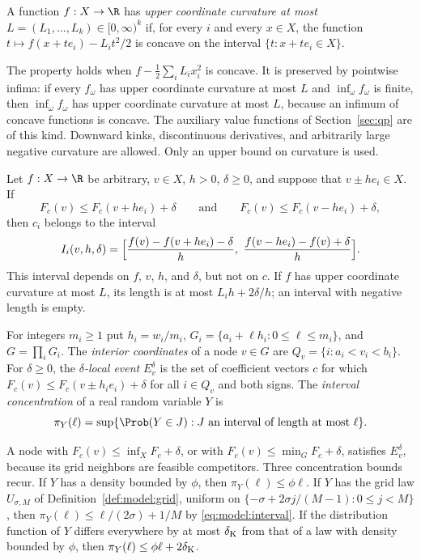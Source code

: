 \begin{definition}\label{def:count:curv}
A function $f:X\to\R$ has \emph{upper coordinate curvature at most}
$L=(L_1,\dots,L_k)\in[0,\infty)^k$ if, for every $i$ and every $x\in X$, the
function $t\mapsto f(x+te_i)-L_it^2/2$ is concave on the interval
$\{t:x+te_i\in X\}$.
\end{definition}

The property holds when $f-\frac12\sum_iL_ix_i^2$ is concave. It is
preserved by pointwise infima: if every $f_\omega$ has upper coordinate
curvature at most $L$ and $\inf_\omega f_\omega$ is finite, then
$\inf_\omega f_\omega$ has upper coordinate curvature at most $L$, because an
infimum of concave functions is concave. The auxiliary value functions of
Section~\ref{sec:qp} are of this kind. Downward kinks, discontinuous
derivatives, and arbitrarily large negative curvature are allowed. Only an
upper bound on curvature is used.

\begin{lemma}\label{lem:count:interval}
Let $f:X\to\R$ be arbitrary, $v\in X$, $h>0$, $\delta\ge0$, and suppose
that $v\pm he_i\in X$. If
\[
 F_c(v)\le F_c(v+he_i)+\delta
 \qquad\text{and}\qquad
 F_c(v)\le F_c(v-he_i)+\delta ,
\]
then $c_i$ belongs to the interval
\[
 I_i(v,h,\delta)=\Bigl[\frac{f(v)-f(v+he_i)-\delta}{h},\
 \frac{f(v-he_i)-f(v)+\delta}{h}\Bigr].
\]
This interval depends on $f$, $v$, $h$, and $\delta$, but not on $c$. If $f$
has upper coordinate curvature at most $L$, its length is at most
$L_ih+2\delta/h$; an interval with negative length is empty.
\end{lemma}

\begin{definition}\label{def:count:local-event}
For integers $m_i\ge1$ put $h_i=w_i/m_i$,
$G_i=\{a_i+\ell h_i:0\le\ell\le m_i\}$, and $G=\prod_iG_i$. The
\emph{interior coordinates} of a node $v\in G$ are
$Q_v=\{i:a_i<v_i<b_i\}$. For $\delta\ge0$, the \emph{$\delta$-local event}
$E_v^\delta$ is the set of coefficient vectors $c$ for which
$F_c(v)\le F_c(v\pm h_ie_i)+\delta$ for all $i\in Q_v$ and both signs. The
\emph{interval concentration} of a real random variable $Y$ is
\[
 \pi_Y(\ell)=\sup\{\Prob(Y\in J): J\text{ an interval of length at most }\ell\}.
\]
\end{definition}

A node with $F_c(v)\le\inf_XF_c+\delta$, or with
$F_c(v)\le\min_GF_c+\delta$, satisfies $E_v^\delta$, because its grid
neighbors are feasible competitors. Three concentration bounds recur. If $Y$
has a density bounded by $\phi$, then $\pi_Y(\ell)\le\phi\ell$. If $Y$ has the
grid law $U_{\sigma,M}$ of Definition~\ref{def:model:grid}, uniform on
$\{-\sigma+2\sigma j/(M-1):0\le j<M\}$, then
$\pi_Y(\ell)\le\ell/(2\sigma)+1/M$ by \eqref{eq:model:interval}.
If the distribution function of $Y$ differs everywhere by at most
$\delta_{\rm K}$ from that of a law with density bounded by $\phi$, then
$\pi_Y(\ell)\le\phi\ell+2\delta_{\rm K}$.

